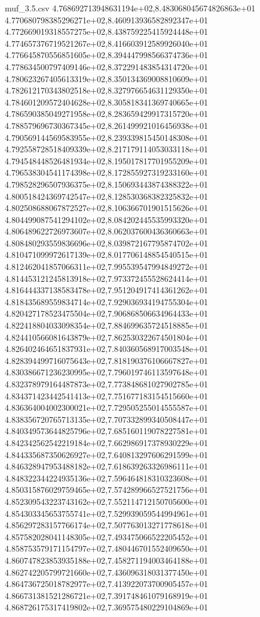 \begin{filecontents*}{muf_3.5.csv}
4.768692713948631194e+02,8.483068045674826863e+01
4.770680798385296271e+02,8.460913936582892347e+01
4.772669019318557275e+02,8.438759225415924448e+01
4.774657376719521267e+02,8.416603912589926040e+01
4.776645870556851605e+02,8.394447998566374736e+01
4.778634500797409146e+02,8.372291483854314720e+01
4.780623267405613319e+02,8.350134369008810609e+01
4.782612170343802518e+02,8.327976654631129350e+01
4.784601209572404628e+02,8.305818341369740665e+01
4.786590385049271958e+02,8.283659429917315720e+01
4.788579696730367345e+02,8.261499921016456938e+01
4.790569144569583955e+02,8.239339815450148308e+01
4.792558728518409339e+02,8.217179114053033118e+01
4.794548448526481934e+02,8.195017817701955209e+01
4.796538304541174398e+02,8.172855927319233160e+01
4.798528296507936375e+02,8.150693443874388322e+01
4.800518424369742547e+02,8.128530368382325832e+01
4.802508688067872527e+02,8.106366701901515626e+01
4.804499087541294102e+02,8.084202445535993320e+01
4.806489622726973607e+02,8.062037600436360663e+01
4.808480293559836696e+02,8.039872167795874702e+01
4.810471099972617139e+02,8.017706148854540515e+01
4.812462041857066311e+02,7.995539547994849272e+01
4.814453121245813918e+02,7.973372455528624414e+01
4.816444337138583478e+02,7.951204917414361262e+01
4.818435689559834714e+02,7.929036934194755304e+01
4.820427178523475504e+02,7.906868506634964433e+01
4.822418804033098354e+02,7.884699635724518885e+01
4.824410566081643879e+02,7.862530322674501804e+01
4.826402464651837931e+02,7.840360568917003548e+01
4.828394499716075643e+02,7.818190376106667827e+01
4.830386671236230995e+02,7.796019746113597648e+01
4.832378979164487873e+02,7.773848681027902785e+01
4.834371423442541413e+02,7.751677183154515660e+01
4.836364004002300021e+02,7.729505255014555587e+01
4.838356720765713135e+02,7.707332899340508447e+01
4.840349573644825796e+02,7.685160119078227581e+01
4.842342562542219184e+02,7.662986917378930229e+01
4.844335687350626927e+02,7.640813297606291599e+01
4.846328947953488182e+02,7.618639263326986111e+01
4.848322344224935136e+02,7.596464818310323608e+01
4.850315876029759465e+02,7.574289966527521756e+01
4.852309543223743162e+02,7.552114712150705600e+01
4.854303345653755741e+02,7.529939059544994961e+01
4.856297283157766174e+02,7.507763013271778618e+01
4.857582028041148305e+02,7.493475066522205452e+01
4.858753579171154797e+02,7.480446701552409650e+01
4.860747823853935188e+02,7.458271194003464188e+01
4.862742205799721660e+02,7.436096318031377450e+01
4.864736725018782977e+02,7.413922073700905457e+01
4.866731381521286721e+02,7.391748461079168919e+01
4.868726175317419802e+02,7.369575480229104869e+01

\end{filecontents*}
